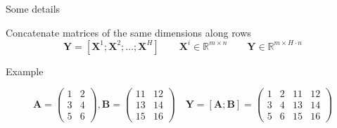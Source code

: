 \documentclass[12pt,aspectratio=169,handout]{beamer}
\begin{document}
\begin{frame}{Some details}
	
	Concatenate matrices of the same dimensions along rows
	$$\bm{Y} = [\bm{X}^1 ; \bm{X}^2 ; \ldots ; \bm{X}^H]
	\qquad
	\bm{X}^i \in \mathbb{R}^{m \times n}
	\qquad
	\bm{Y} \in \mathbb{R}^{m \times H \cdot n}$$
	
	\begin{block}{Example}
		\begin{small}
			$$
			\bm{A} =
			\begin{pmatrix}
				1 & 2 \\
				3 & 4 \\
				5 & 6
			\end{pmatrix}
			,
			\bm{B} =
			\begin{pmatrix}
				11 & 12 \\
				13 & 14 \\
				15 & 16
			\end{pmatrix}
			\quad
			\bm{Y} = [\bm{A} ; \bm{B} ] =
			\begin{pmatrix}
				1 & 2 & 11 & 12 \\
				3 & 4 & 13 & 14 \\
				5 & 6 & 15 & 16
			\end{pmatrix}
			$$
		\end{small}
	\end{block}
	
	
\end{frame}
\end{document}

